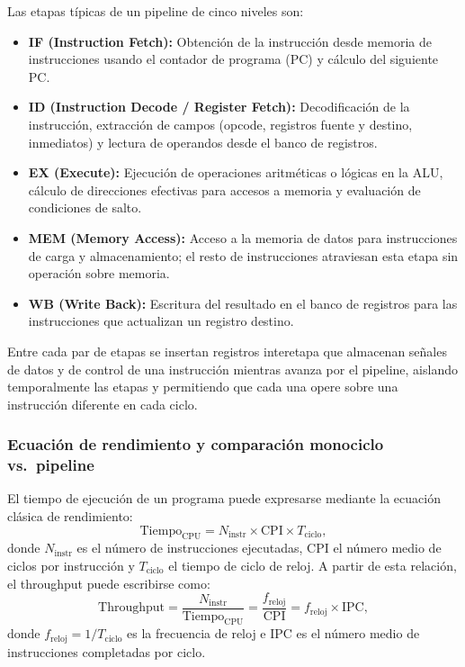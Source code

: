 Las etapas típicas de un pipeline de cinco niveles son:
\begin{itemize}
  \item \textbf{IF (Instruction Fetch):} Obtención de la instrucción desde memoria de instrucciones usando el contador de programa (PC) y cálculo del siguiente PC.
  \item \textbf{ID (Instruction Decode / Register Fetch):} Decodificación de la instrucción, extracción de campos (opcode, registros fuente y destino, inmediatos) y lectura de operandos desde el banco de registros.
  \item \textbf{EX (Execute):} Ejecución de operaciones aritméticas o lógicas en la ALU, cálculo de direcciones efectivas para accesos a memoria y evaluación de condiciones de salto.
  \item \textbf{MEM (Memory Access):} Acceso a la memoria de datos para instrucciones de carga y almacenamiento; el resto de instrucciones atraviesan esta etapa sin operación sobre memoria.
  \item \textbf{WB (Write Back):} Escritura del resultado en el banco de registros para las instrucciones que actualizan un registro destino.
\end{itemize}

Entre cada par de etapas se insertan registros interetapa que almacenan señales de datos y de control de una instrucción mientras avanza por el pipeline, aislando temporalmente las etapas y permitiendo que cada una opere sobre una instrucción diferente en cada ciclo.


\subsubsection{Ecuación de rendimiento y comparación monociclo vs.\ pipeline}

El tiempo de ejecución de un programa puede expresarse mediante la ecuación clásica de rendimiento:
\[
\text{Tiempo}_{\text{CPU}} = N_{\text{instr}} \times \text{CPI} \times T_{\text{ciclo}},
\]
donde \(N_{\text{instr}}\) es el número de instrucciones ejecutadas, CPI el número medio de ciclos por instrucción y \(T_{\text{ciclo}}\) el tiempo de ciclo de reloj.\parencite{Patterson2017Computer}
A partir de esta relación, el throughput puede escribirse como:
\[
\text{Throughput} = \frac{N_{\text{instr}}}{\text{Tiempo}_{\text{CPU}}} = \frac{f_{\text{reloj}}}{\text{CPI}} = f_{\text{reloj}} \times \text{IPC},
\]
donde \(f_{\text{reloj}} = 1/T_{\text{ciclo}}\) es la frecuencia de reloj e IPC es el número medio de instrucciones completadas por ciclo.

